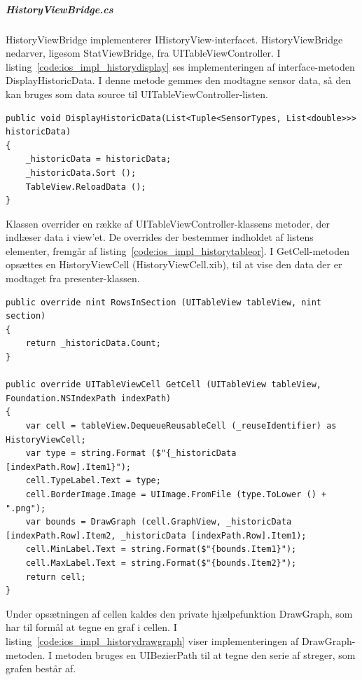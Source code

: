 \subparagraph{HistoryViewBridge.cs}
HistoryViewBridge implementerer IHistoryView-interfacet. HistoryViewBridge nedarver, ligesom StatViewBridge, fra UITableViewController. I listing~\ref{code:ios_impl_historydisplay} ses implementeringen af interface-metoden DisplayHistoricData. I denne metode gemmes den modtagne sensor data, så den kan bruges som data source til UITableViewController-listen.

\begin{lstlisting}[caption={DisplayHistoricData(...)},label={code:ios_impl_historydisplay}]
public void DisplayHistoricData(List<Tuple<SensorTypes, List<double>>> historicData)
{
	_historicData = historicData;
	_historicData.Sort ();
	TableView.ReloadData ();
}
\end{lstlisting}

Klassen overrider en række af UITableViewController-klassens metoder, der indlæser data i view'et. De overrides der bestemmer indholdet af listens elementer, fremgår af listing~\ref{code:ios_impl_historytableor}. I GetCell-metoden opsættes en HistoryViewCell (HistoryViewCell.xib), til at vise den data der er modtaget fra presenter-klassen.

\begin{lstlisting}[caption={Overrides af UITableViewController-metoder i HistoryViewBridge},label={code:ios_impl_historytableor}]
public override nint RowsInSection (UITableView tableView, nint section)
{
	return _historicData.Count;
}

public override UITableViewCell GetCell (UITableView tableView, Foundation.NSIndexPath indexPath)
{
	var cell = tableView.DequeueReusableCell (_reuseIdentifier) as HistoryViewCell;
	var type = string.Format ($"{_historicData [indexPath.Row].Item1}");
	cell.TypeLabel.Text = type;
	cell.BorderImage.Image = UIImage.FromFile (type.ToLower () + ".png");
	var bounds = DrawGraph (cell.GraphView, _historicData [indexPath.Row].Item2, _historicData [indexPath.Row].Item1);
	cell.MinLabel.Text = string.Format($"{bounds.Item1}");
	cell.MaxLabel.Text = string.Format($"{bounds.Item2}");
	return cell;
}
\end{lstlisting}

Under opsætningen af cellen kaldes den private hjælpefunktion DrawGraph, som har til formål at tegne en graf i cellen. I listing~\ref{code:ios_impl_historydrawgraph} viser implementeringen af DrawGraph-metoden. I metoden bruges en UIBezierPath til at tegne den serie af streger, som grafen består af.

